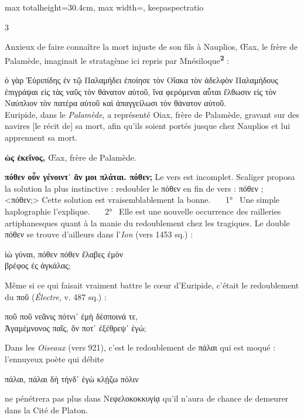 \documentclass[11pt,twoside]{book}
\newcommand{\italique}[1]{\textit{#1}}
\newcommand{\citComm}[1]{\begin{quoting}[vskip=0.4pt,leftmargin=0.7em,rightmargin=0.2em]#1\end{quoting}}
\newcommand{\francais}[1]{{\policeFr #1}}
\newcommand{\marqueur}[1]{\textsuperscript{\color{rubricRed}\textbf{#1}}}
\begin{document}
\begin{adjustbox}{max totalheight=30.4cm, max width=\textwidth, keepaspectratio}
\begin{minipage}{\textwidth}
{\begin{multicols}{3}
\par\vspace{1.5pt}
\noindent Anxieux de faire connaître la mort injuste de son fils à Nauplios, Œax, le frère de Palamède, imaginait le stratagème ici repris par Mnésiloque\marqueur{2} :
\citComm{ὁ γὰρ Ἐὐριπίδης ἐν τῷ Παλαμήδει ἐποίησε τὸν Οἴακα τὸν ἀδελφὸν Παλαμήδους ἐπιγράψαι εἰς τὰς ναῦς τὸν θάνατον αὐτοῦ, ἵνα φερόμεναι αὗται ἔλθωσιν εἰς τὸν Ναύπλιον τὸν πατέρα αὐτοῦ καὶ ἀπαγγείλωσι τὸν θάνατον αὐτοῦ.\\
\francais{Euripide, dans le \italique{Palamède}, a représenté Oiax, frère de Palamède, gravant sur des navires [le récit de] sa mort, afin qu'ils soient portés jusque chez Nauplios et lui apprennent sa mort.}}
\par\vspace{1.5pt}
 \textbf{ὡς ἐκεῖνος,} Œax, frère de Palamède.
\par\vspace{1.5pt}
 \textbf{πόθεν οὖν γένοιντ᾽ ἄν μοι πλάται. πόθεν;} Le vers est incomplet. Scaliger proposa la solution la plus instinctive : redoubler le πόθεν en fin de vers : πόθεν ; <πόθεν;> Cette solution est vraisemblablement la bonne. \ \ \ 1° \ Une simple haplographie l'explique. \ \ \ 2° \ Elle est une nouvelle occurrence des railleries artiphanesques quant à la manie du redoublement chez les tragiques. Le double πόθεν se trouve d'ailleurs dans l'\italique{Ion} (vers 1453 sq.) :
\citComm{ἰὼ γύναι, πόθεν πόθεν ἔλαβες ἐμὸν\\
βρέφος ἐς ἀγκάλας;}
\par\vspace{1.5pt}
\noindent Même si ce qui faisait vraiment battre le cœur d'Euripide, c'était le redoublement du ποῦ (\italique{Électre}, v. 487 sq.) :
\citComm{ποῦ ποῦ νεᾶνις πότνι᾽ ἐμὴ δέσποινά τε,\\
Ἀγαμέμνονος παῖς, ὅν ποτ᾽ ἐξέθρεψ᾽ ἐγώ;}
\par\vspace{1.5pt}
\noindent Dans les \italique{Oiseaux} (vers 921), c'est le redoublement de πάλαι qui est moqué : l'ennuyeux poète qui débite
\citComm{πάλαι, πάλαι δὴ τήνδ᾽ ἐγὼ κλῄζω πόλιν}
\par\vspace{1.5pt}
\noindent ne pénétrera pas plus dans Νεφελοκοκκυγίᾳ qu'il n'aura de chance de demeurer dans la Cité de Platon.
\par\vspace{1.5pt}

\end{multicols}}
\end{minipage}
\end{adjustbox}
\end{document}

